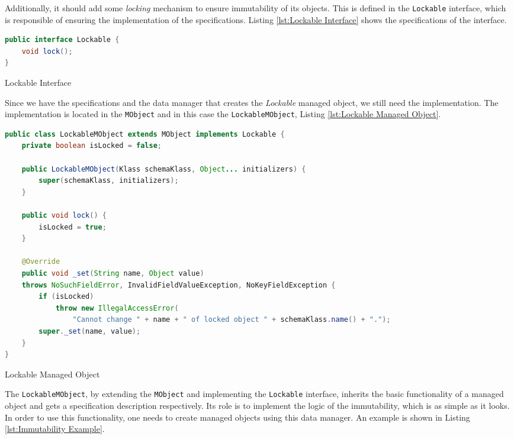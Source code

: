 Additionally, it should add some \textit{locking} mechanism to ensure immutability of its objects.
This is defined in the \texttt{Lockable} interface, which is responsible of ensuring the implementation of the specifications. 
Listing \ref{lst:Lockable Interface} shows the specifications of the interface.

\begin{sourcecode} [H]
	\begin{lstlisting}[language=Java, escapechar=|]
public interface Lockable {
	void lock();
}
	\end{lstlisting}
	\caption{Lockable Interface}
	\label{lst:Lockable Interface}
\end{sourcecode}

Since we have the specifications and the data manager that creates the \textit{Lockable} managed object, we still need the implementation.
The implementation is located in the \texttt{MObject} and in this case the \texttt{LockableMObject}, 
Listing \ref{lst:Lockable Managed Object}.

\begin{sourcecode} [H]
	\begin{lstlisting}[language=Java, escapechar=|]
public class LockableMObject extends MObject implements Lockable {
	private boolean isLocked = false;

	public LockableMObject(Klass schemaKlass, Object... initializers) {
		super(schemaKlass, initializers);
	}

	public void lock() {
		isLocked = true;
	}

	@Override
	public void _set(String name, Object value) 
	throws NoSuchFieldError, InvalidFieldValueException, NoKeyFieldException {
		if (isLocked)
	    	throw new IllegalAccessError(
	    		"Cannot change " + name + " of locked object " + schemaKlass.name() + ".");
		super._set(name, value);
	}
}
	\end{lstlisting}
	\caption{Lockable Managed Object}
	\label{lst:Lockable Managed Object}
\end{sourcecode}

The \texttt{LockableMObject}, by extending the \texttt{MObject} and implementing the \texttt{Lockable} interface, inherits the basic functionality of a managed object and gets a specification description respectively.
Its role is to implement the logic of the immutability, which is as simple as it looks.
In order to use this functionality, one needs to create managed objects using this data manager.
An example is shown in Listing \ref{lst:Immutability Example}.

